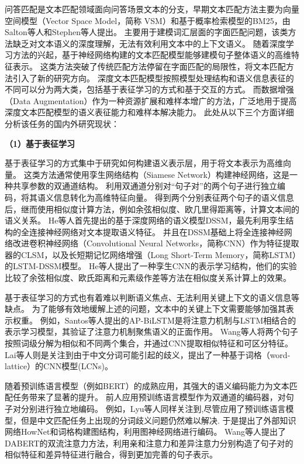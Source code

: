问答匹配是文本匹配领域面向问答场景文本的分支，早期文本匹配方法主要为向量空间模型（Vector Space Model，简称 VSM）\cite{salton1975vector}和基于概率检索模型的BM25\cite{robertson1994some}，由Salton等人和Stephen等人提出。
主要用于建模词汇层面的字面匹配问题，该类方法缺乏对文本语义的深度理解，无法有效利用文本中的上下文语义。
随着深度学习方法的兴起，基于神经网络构建的文本匹配模型能够建模句子整体语义的高维特征表示。
这类方法突破了传统匹配方法停留在字面匹配的局限性，将文本匹配方法引入了新的研究方向。
深度文本匹配模型按照模型处理结构和语义信息表征的不同可以分为两大类，包括基于表征学习的方式和基于交互的方式。
而数据增强（Data Augmentation）作为一种资源扩展和难样本增广的方法，广泛地用于提高深度文本匹配模型的语义表征能力和难样本解决能力。
此处从以下三个方面详细分析该任务的国内外研究现状：

\textbf{\songti （1）基于表征学习}

基于表征学习的方式集中于研究如何构建语义表示层，用于将文本表示为高维向量。
这类方法通常使用孪生网络结构（Siamese Network）构建神经网络，这是一种共享参数的双通道结构。
利用双通道分别对“句子对”的两个句子进行独立编码，将其语义信息转化为高维特征向量。
得到两个分别表征两个句子的语义信息后，继而使用相似度计算方法，例如余弦相似度、欧几里得距离等，计算文本间的语义关系。
He等人首先提出的基于深度网络的语义模型DSSM\cite{huang2013learning}，最先利用孪生结构的全连接神经网络对文本提取语义特征。
并且在DSSM基础上将全连接神经网络改进卷积神经网络（Convolutional Neural Networks，简称CNN）作为特征提取器的CLSM\cite{shen2014latent}，以及长短期记忆网络增强（Long Short-Term Memory，简称LSTM）的LSTM-DSSM\cite{palangi2014semantic}模型。
He等人提出了一种孪生CNN的表示学习结构\cite{he2015multi}，他们的实验比较了余弦相似度、欧氏距离和元素级作差等方法在相似度关系计算上的效果。

基于表征学习的方式也有着难以判断语义焦点、无法利用关键上下文的语义信息等缺点。
为了能够有效地缓解上述的问题，文本中的关键上下文需要能够加强其表示权重。
例如，Santos等人提出的AP-BiLSTM\cite{santos2016attentive}是将注意力机制与LSTM相结合的表示学习模型，其验证了注意力机制聚焦语义的正面作用。
Wang等人\cite{wang2016sentence}将两个句子按照词级分解为相似和不同两个集合，并通过CNN提取相似特征和可区分特征。 
Lai等人则是关注到由于中文分词可能引起的歧义，提出了一种基于词格（word-lattice）的CNN模型(LCNs)\cite{lai2019lattice}。

随着预训练语言模型（例如BERT\cite{devlin2018bert}）的成熟应用，其强大的语义编码能力为文本匹配任务带来了显著的提升。
前人应用预训练语言模型作为双通道的编码器，对句子对分别进行独立地编码。
例如，Lyu等人\cite{lyu2021let}同样关注到,尽管应用了预训练语言模型，但是中文匹配任务上出现的分词歧义问题仍然难以解决.
于是提出了外部知识网络HowNet\cite{dong2003hownet}和词格构建图结构，利用图神经网络进行编码。
Wang等人提出了DABERT\cite{wang-etal-2022-dabert}的双流注意力方法，利用亲和注意力和差异注意力分别构造了句子对的相似特征和差异特征进行融合，得到更加完善的句子表示。


